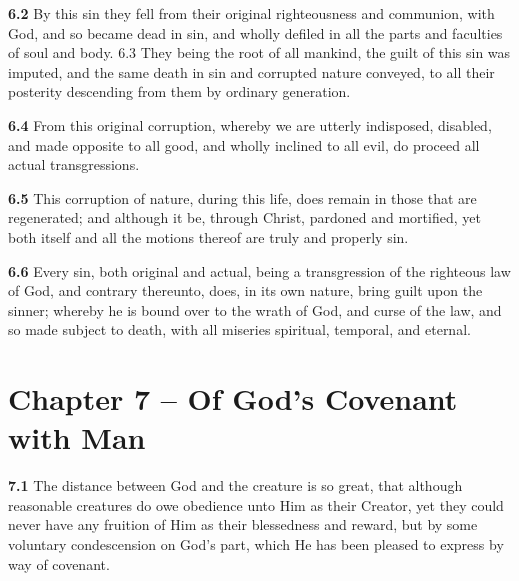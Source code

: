 \par\textbf{6.2} By this sin they fell from their original righteousness and communion, with God, and so became dead in sin, and wholly defiled in all the parts and faculties of soul and body.  6.3 They being the root of all mankind, the guilt of this sin was imputed, and the same death in sin and corrupted nature conveyed, to all their posterity descending from them by ordinary generation.   

\par\textbf{6.4} From this original corruption, whereby we are utterly indisposed, disabled, and made opposite to all good, and wholly inclined to all evil, do proceed all actual transgressions.   

\par\textbf{6.5} This corruption of nature, during this life, does remain in those that are regenerated; and although it be, through Christ, pardoned and mortified, yet both itself and all the motions thereof are truly and properly sin.   

\par\textbf{6.6} Every sin, both original and actual, being a transgression of the righteous law of God, and contrary thereunto, does, in its own nature, bring guilt upon the sinner; whereby he is bound over to the wrath of God, and curse of the law, and so made subject to death, with all miseries spiritual, temporal, and eternal.  

\section{Chapter 7 -- Of God's Covenant with Man}

\par\textbf{7.1} The distance between God and the creature is so great, that although reasonable creatures do owe obedience unto Him as their Creator, yet they could never have any fruition of Him as their blessedness and reward, but by some voluntary condescension on God's part, which He has been pleased to express by way of covenant.   

